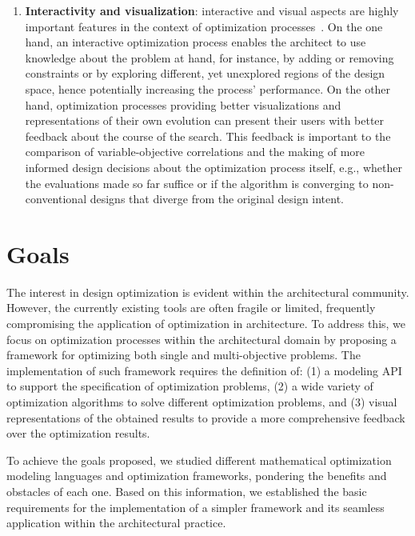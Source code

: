 \begin{enumerate}
\item \textbf{Interactivity and visualization}: interactive and visual aspects are highly important features in the context of optimization processes~\cite{Ashour2015CreativelyMOO}. On the one hand, an interactive optimization process enables the architect to use knowledge about the problem at hand, for instance, by adding or removing constraints or by exploring different, yet unexplored regions of the design space, hence potentially increasing the process' performance. On the other hand, optimization processes providing better visualizations and representations of their own evolution can present their users with better feedback about the course of the search. This feedback is important to the comparison of variable-objective correlations and the making of more informed design decisions about the optimization process itself, e.g., whether the evaluations made so far suffice or if the algorithm is converging to non-conventional designs that diverge from the original design intent.
\end{enumerate}


\section{Goals}
The interest in design optimization is evident within the architectural community. However, the currently existing tools are often fragile or limited, frequently compromising the application of optimization in architecture. To address this, we focus on optimization processes within the architectural domain by proposing a framework for optimizing both single and multi-objective problems. The implementation of such framework requires the definition of: (1) a modeling \ac{API} to support the specification of optimization problems, (2) a wide variety of optimization algorithms to solve different optimization problems, and (3) visual representations of the obtained results to provide a more comprehensive feedback over the optimization results.

To achieve the goals proposed, we studied different mathematical optimization modeling languages and optimization frameworks, pondering the benefits and obstacles of each one. Based on this information, we established the basic requirements for the implementation of a simpler framework and its seamless application within the architectural practice. 

